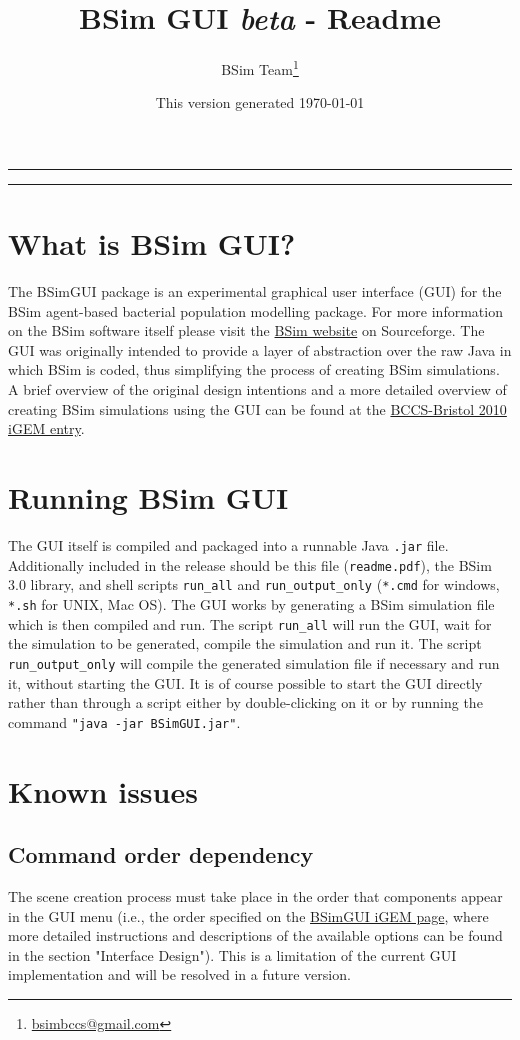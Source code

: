 \documentclass[a4paper,11pt]{article}
\title{BSim GUI \emph{beta} - Readme}
\author{BSim Team\footnote{\href{mailto:bsimbccs@gmail.com}{bsimbccs@gmail.com}}}
\date{This version generated \today}
\begin{document}
\maketitle
\rule{0.9\textwidth}{0.5pt}
\tableofcontents
\vspace{1em}
\rule{0.9\textwidth}{0.5pt}

\section{What is BSim GUI?}
The BSimGUI package is an experimental graphical user interface (GUI) for the BSim agent-based bacterial population modelling package.
For more information on the BSim software itself please visit the \href{http://bsim-bccs.sourceforge.net/}{BSim website} on Sourceforge.
The GUI was originally intended to provide a layer of abstraction over the raw Java in which BSim is coded, thus simplifying the process of creating BSim simulations.
A brief overview of the original design intentions and a more detailed overview of creating BSim simulations using the GUI can be found at the \href{http://2010.igem.org/Team:BCCS-Bristol/Modelling/BSIM/GUI}{BCCS-Bristol 2010 iGEM entry}.

\section{Running BSim GUI}
The GUI itself is compiled and packaged into a runnable Java \texttt{.jar} file.
Additionally included in the release should be this file (\texttt{readme.pdf}), the BSim 3.0 library, and shell scripts \texttt{run\_all} and \texttt{run\_output\_only} (\texttt{*.cmd} for windows, \texttt{*.sh} for UNIX, Mac OS).
The GUI works by generating a BSim simulation file which is then compiled and run.
The script \texttt{run\_all} will run the GUI, wait for the simulation to be generated, compile the simulation and run it.
The script \texttt{run\_output\_only} will compile the generated simulation file if necessary and run it, without starting the GUI.
It is of course possible to start the GUI directly rather than through a script either by double-clicking on it or by running the command \texttt{"java -jar BSimGUI.jar"}.

\section{Known issues}

\subsection{Command order dependency}
The scene creation process must take place in the order that components appear in the GUI menu (i.e., the order specified on the \href{http://2010.igem.org/Team:BCCS-Bristol/Modelling/BSIM/GUI}{BSimGUI iGEM page}, where more detailed instructions and descriptions of the available options can be found in the section "Interface Design").
This is a limitation of the current GUI implementation and will be resolved in a future version.
\end{document}
